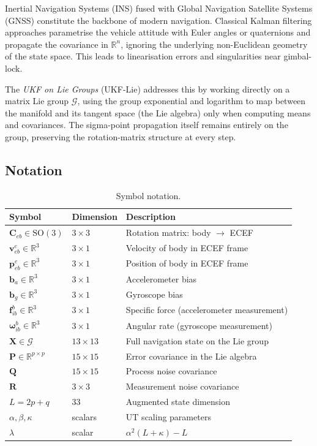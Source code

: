 \documentclass[11pt,a4paper]{article}
\theoremstyle{definition}
\theoremstyle{plain}
\newcommand{\SO}{\mathrm{SO}(3)}
\newcommand{\Ceb}{\mathbf{C}_{eb}}
\newcommand{\veb}{\mathbf{v}_{eb}^e}
\newcommand{\peb}{\mathbf{p}_{eb}^e}
\newcommand{\ba}{\mathbf{b}_a}
\newcommand{\bg}{\mathbf{b}_g}
\newcommand{\fib}{\mathbf{f}_{ib}^b}
\newcommand{\wib}{\bm{\omega}_{ib}^b}
\newcommand{\bX}{\mathbf{X}}
\newcommand{\bP}{\mathbf{P}}
\newcommand{\bQ}{\mathbf{Q}}
\newcommand{\bR}{\mathbf{R}}
\begin{document}
Inertial Navigation Systems (INS) fused with Global Navigation Satellite Systems (GNSS)
constitute the backbone of modern navigation.
Classical Kalman filtering approaches parametrise the vehicle attitude with Euler angles or
quaternions and propagate the covariance in $\mathbb{R}^n$, ignoring the underlying
non-Euclidean geometry of the state space.
This leads to linearisation errors and singularities near gimbal-lock.

The \emph{UKF on Lie Groups} (UKF-Lie) addresses this by working directly on a
matrix Lie group $\mathcal{G}$, using the group exponential and logarithm to
map between the manifold and its tangent space (the Lie algebra) only when
computing means and covariances.
The sigma-point propagation itself remains entirely on the group, preserving
the rotation-matrix structure at every step.

\subsection{Notation}

\begin{table}[h!]
\centering
\caption{Symbol notation.}
\label{tab:notation}
\renewcommand{\arraystretch}{1.4}
\begin{tabular}{@{}lll@{}}
\toprule
Symbol & Dimension & Description \\
\midrule
$\Ceb \in \SO$ & $3\times 3$ & Rotation matrix: body $\to$ ECEF \\
$\veb \in \mathbb{R}^3$ & $3\times 1$ & Velocity of body in ECEF frame \\
$\peb \in \mathbb{R}^3$ & $3\times 1$ & Position of body in ECEF frame \\
$\ba \in \mathbb{R}^3$ & $3\times 1$ & Accelerometer bias \\
$\bg \in \mathbb{R}^3$ & $3\times 1$ & Gyroscope bias \\
$\fib \in \mathbb{R}^3$ & $3\times 1$ & Specific force (accelerometer measurement) \\
$\wib \in \mathbb{R}^3$ & $3\times 1$ & Angular rate (gyroscope measurement) \\
$\bX \in \mathcal{G}$ & $13\times 13$ & Full navigation state on the Lie group \\
$\bP \in \mathbb{R}^{p\times p}$ & $15\times 15$ & Error covariance in the Lie algebra \\
$\bQ$ & $15\times 15$ & Process noise covariance \\
$\bR$ & $3\times 3$ & Measurement noise covariance \\
$L = 2p+q$ & $33$ & Augmented state dimension \\
$\alpha,\beta,\kappa$ & scalars & UT scaling parameters \\
$\lambda$ & scalar & $\alpha^2(L+\kappa)-L$ \\
\bottomrule
\end{tabular}
\end{table}
\end{document}
